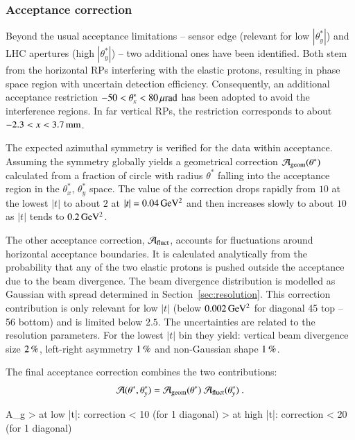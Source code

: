 


\subsubsection{Acceptance correction}

Beyond the usual acceptance limitations -- sensor edge (relevant for low $|\theta^*_y|$) and LHC apertures (high $|\theta_y^*|$) -- two additional ones have been identified. Both stem from the horizontal RPs interfering with the elastic protons, resulting in phase space region with uncertain detection efficiency. Consequently, an additional acceptance restriction $-50 < \theta_x^* < 80\,{\rm \mu rad}$ has been adopted to avoid the interference regions. In far vertical RPs, the restriction corresponds to about $-2.3 < x < 3.7\,{\rm mm}$.

The expected azimuthal symmetry is verified for the data within acceptance. Assuming the symmetry globally yields a geometrical correction ${\cal A}_{\rm geom}(\theta^*)$ calculated from a fraction of circle with radius $\theta^*$ falling into the acceptance region in the $\theta_x^*$, $\theta_y^*$ space. The value of the correction drops rapidly from $10$ at the lowest $|t|$ to about $2$ at $|t| = 0.04\,{\rm GeV^2}$ and then increases slowly to about $10$ as $|t|$ tends to $0.2\,{\rm GeV^2}$.

The other acceptance correction, ${\cal A}_{\rm fluct}$, accounts for fluctuations around horizontal acceptance boundaries. It is calculated analytically from the probability that any of the two elastic protons is pushed outside the acceptance due to the beam divergence. The beam divergence distribution is modelled as Gaussian with spread determined in Section~\ref{sec:resolution}. This correction contribution is only relevant for low $|t|$ (below $0.002\,{\rm GeV^2}$ for diagonal 45 top -- 56 bottom) and is limited below $2.5$. The uncertainties are related to the resolution parameters. For the lowest $|t|$ bin they yield: vertical beam divergence size $2\,{\rm \%}$, left-right asymmetry $1\,{\rm \%}$ and non-Gaussian shape $1\,{\rm \%}$.

The final acceptance correction combines the two contributions:
\begin{equation}
{\cal A}(\theta^*, \theta_y^*) = {\cal A}_{\rm geom}(\theta^*)\ {\cal A}_{\rm fluct}(\theta_y^*)\ .
\end{equation}

\iffalse
\> A_g
\>> at low |t|: correction < 10 (for 1 diagonal)
\>> at high |t|: correction < 20 (for 1 diagonal)

